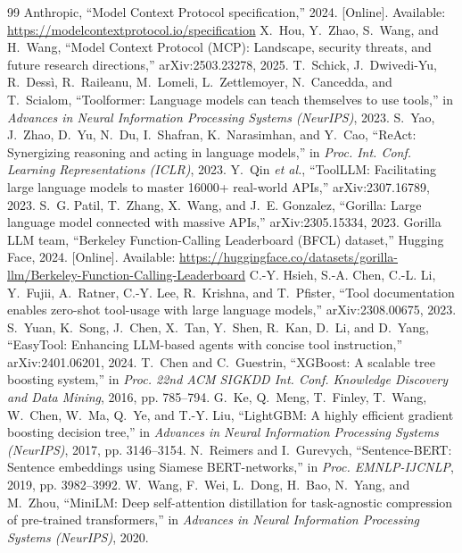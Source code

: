 \documentclass[conference]{IEEEtran}
\begin{document}
\begin{thebibliography}{99}
 Anthropic, ``Model Context Protocol specification,'' 2024. [Online]. Available: \url{https://modelcontextprotocol.io/specification}
 X.~Hou, Y.~Zhao, S.~Wang, and H.~Wang, ``Model Context Protocol (MCP): Landscape, security threats, and future research directions,'' arXiv:2503.23278, 2025.
 T.~Schick, J.~Dwivedi-Yu, R.~Dess\`{i}, R.~Raileanu, M.~Lomeli, L.~Zettlemoyer, N.~Cancedda, and T.~Scialom, ``Toolformer: Language models can teach themselves to use tools,'' in \emph{Advances in Neural Information Processing Systems (NeurIPS)}, 2023.
 S.~Yao, J.~Zhao, D.~Yu, N.~Du, I.~Shafran, K.~Narasimhan, and Y.~Cao, ``ReAct: Synergizing reasoning and acting in language models,'' in \emph{Proc. Int. Conf. Learning Representations (ICLR)}, 2023.
 Y.~Qin \emph{et al.}, ``ToolLLM: Facilitating large language models to master 16000+ real-world APIs,'' arXiv:2307.16789, 2023.
 S.~G. Patil, T.~Zhang, X.~Wang, and J.~E. Gonzalez, ``Gorilla: Large language model connected with massive APIs,'' arXiv:2305.15334, 2023.
 Gorilla LLM team, ``Berkeley Function-Calling Leaderboard (BFCL) dataset,'' Hugging Face, 2024. [Online]. Available: \url{https://huggingface.co/datasets/gorilla-llm/Berkeley-Function-Calling-Leaderboard}
 C.-Y. Hsieh, S.-A. Chen, C.-L. Li, Y.~Fujii, A.~Ratner, C.-Y. Lee, R.~Krishna, and T.~Pfister, ``Tool documentation enables zero-shot tool-usage with large language models,'' arXiv:2308.00675, 2023.
 S.~Yuan, K.~Song, J.~Chen, X.~Tan, Y.~Shen, R.~Kan, D.~Li, and D.~Yang, ``EasyTool: Enhancing LLM-based agents with concise tool instruction,'' arXiv:2401.06201, 2024.
 T.~Chen and C.~Guestrin, ``XGBoost: A scalable tree boosting system,'' in \emph{Proc. 22nd ACM SIGKDD Int. Conf. Knowledge Discovery and Data Mining}, 2016, pp. 785--794.
 G.~Ke, Q.~Meng, T.~Finley, T.~Wang, W.~Chen, W.~Ma, Q.~Ye, and T.-Y. Liu, ``LightGBM: A highly efficient gradient boosting decision tree,'' in \emph{Advances in Neural Information Processing Systems (NeurIPS)}, 2017, pp. 3146--3154.
 N.~Reimers and I.~Gurevych, ``Sentence-BERT: Sentence embeddings using Siamese BERT-networks,'' in \emph{Proc. EMNLP-IJCNLP}, 2019, pp. 3982--3992.
 W.~Wang, F.~Wei, L.~Dong, H.~Bao, N.~Yang, and M.~Zhou, ``MiniLM: Deep self-attention distillation for task-agnostic compression of pre-trained transformers,'' in \emph{Advances in Neural Information Processing Systems (NeurIPS)}, 2020.

\end{thebibliography}
\end{document}
